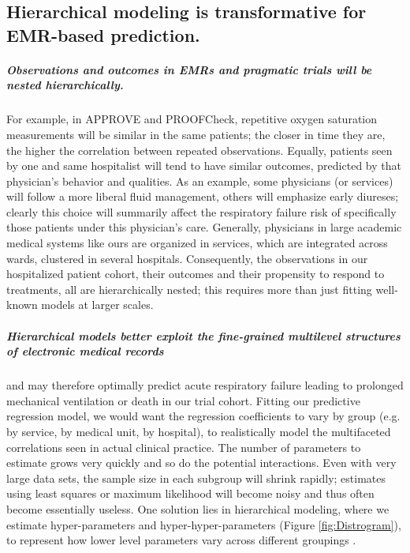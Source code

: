 \documentclass[11pt,notitlepage]{article}
\begin{document}
\subsection*{Hierarchical modeling is transformative for EMR-based prediction.}

\subparagraph{Observations and outcomes in EMRs and pragmatic trials will be nested hierarchically.}
For example, in APPROVE and PROOFCheck, repetitive oxygen saturation measurements will be similar in the same patients; the closer in time they are, the higher the correlation between repeated observations. Equally, patients seen by one and same hospitalist will tend to have similar outcomes, predicted by that physician's behavior and qualities. As an example, some physicians (or services) will follow a more liberal fluid management, others will emphasize early diureses; clearly this choice will summarily affect the respiratory failure risk of specifically those patients under this physician's care. Generally, physicians in large academic medical systems like ours are organized in services, which are integrated across wards, clustered in several hospitals. Consequently, the observations in our hospitalized patient cohort, their outcomes and their propensity to respond to treatments, all are hierarchically nested; this requires more than just fitting well-known models at larger scales. 

\subparagraph*{Hierarchical models better exploit the fine-grained multilevel structures of electronic medical records} and may therefore optimally predict acute respiratory failure leading to prolonged mechanical ventilation or death in our trial cohort. Fitting our predictive regression model, we would want the regression coefficients to vary by group (e.g. by service, by medical unit, by hospital), to realistically model the multifaceted correlations seen in actual clinical practice. The number of parameters to estimate grows very quickly and so do the potential interactions. Even with very large data sets, the sample size in each subgroup will shrink rapidly; estimates using least squares or maximum likelihood will become noisy and thus often become essentially useless. One solution lies in hierarchical modeling, where we estimate hyper-parameters and hyper-hyper-parameters (Figure \ref{fig:Distrogram}), to represent how lower level parameters vary across different groupings \cite{Bafumi_Gelman_2007}.
\end{document}
